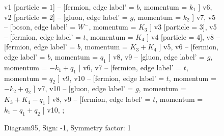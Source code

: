 \documentclass{revtex4}
\begin{document}
\begin{figure}[!htb]
\begin{center}
{    %
v1 [particle = \(1\)] -- [fermion, edge label' = \(b\), momentum = \(k_{1}\) ] v6, 
v2 [particle = \(2\)] -- [gluon, edge label' = \(g\), momentum = \(k_{2}\) ] v7, 
v5 -- [boson, edge label' = \(W^{-}\), momentum = \(K_{3}\) ] v3 [particle = \(3\)], 
v5 -- [fermion, edge label' = \(t\), momentum = \(K_{4}\) ] v4 [particle = \(4\)], 
v8 -- [fermion, edge label' = \(b\), momentum = \(K_{3} + K_{4}\) ] v5, 
v6 -- [fermion, edge label' = \(b\), momentum = \(q_{1}\) ] v8, 
v9 -- [gluon, edge label' = \(g\), momentum = \(-k_{1} + q_{1}\) ] v6, 
v7 -- [fermion, edge label' = \(t\), momentum = \(q_{2}\) ] v9, 
v10 -- [fermion, edge label' = \(t\), momentum = \(-k_{2} + q_{2}\) ] v7, 
v10 -- [gluon, edge label' = \(g\), momentum = \(K_{3} + K_{4} - q_{1}\) ] v8, 
v9 -- [fermion, edge label' = \(t\), momentum = \(k_{1} - q_{1} + q_{2}\) ] v10, 
};
\end{center}
\caption{Diagram95, Sign: -1, Symmetry factor: 1}
\end{figure}
\newpage
\end{document}
